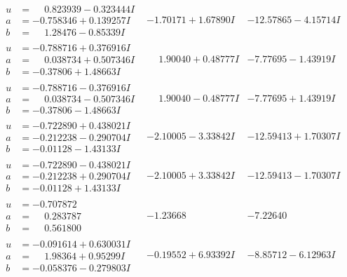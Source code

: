 \documentclass[1p]{elsarticle_modified}
\theoremstyle{definition}
\begin{document}
$$\begin{array}{c|c|c}
\begin{aligned}
u &= \phantom{-}0.823939 - 0.323444 I \\
a &= -0.758346 + 0.139257 I \\
b &= \phantom{-}1.28476 - 0.85339 I\end{aligned}
 & -1.70171 + 1.67890 I & -12.57865 - 4.15714 I \\ \hline\begin{aligned}
u &= -0.788716 + 0.376916 I \\
a &= \phantom{-}0.038734 + 0.507346 I \\
b &= -0.37806 + 1.48663 I\end{aligned}
 & \phantom{-}1.90040 + 0.48777 I & -7.77695 - 1.43919 I \\ \hline\begin{aligned}
u &= -0.788716 - 0.376916 I \\
a &= \phantom{-}0.038734 - 0.507346 I \\
b &= -0.37806 - 1.48663 I\end{aligned}
 & \phantom{-}1.90040 - 0.48777 I & -7.77695 + 1.43919 I \\ \hline\begin{aligned}
u &= -0.722890 + 0.438021 I \\
a &= -0.212238 - 0.290704 I \\
b &= -0.01128 - 1.43133 I\end{aligned}
 & -2.10005 - 3.33842 I & -12.59413 + 1.70307 I \\ \hline\begin{aligned}
u &= -0.722890 - 0.438021 I \\
a &= -0.212238 + 0.290704 I \\
b &= -0.01128 + 1.43133 I\end{aligned}
 & -2.10005 + 3.33842 I & -12.59413 - 1.70307 I \\ \hline\begin{aligned}
u &= -0.707872\phantom{ +0.000000I} \\
a &= \phantom{-}0.283787\phantom{ +0.000000I} \\
b &= \phantom{-}0.561800\phantom{ +0.000000I}\end{aligned}
 & -1.23668\phantom{ +0.000000I} & -7.22640\phantom{ +0.000000I} \\ \hline\begin{aligned}
u &= -0.091614 + 0.630031 I \\
a &= \phantom{-}1.98364 + 0.95299 I \\
b &= -0.058376 - 0.279803 I\end{aligned}
 & -0.19552 + 6.93392 I & -8.85712 - 6.12963 I \\ \hline\begin{aligned}

\end{aligned}
\end{array}$$
\end{document}

